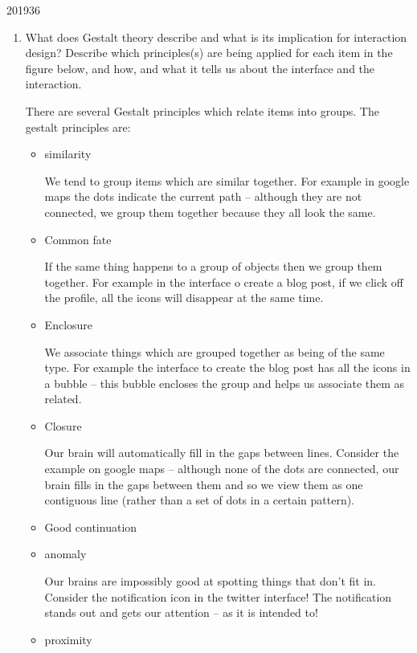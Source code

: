 \documentclass[10pt,\jkfside,a4paper]{article}
\begin{document}
\begin{examquestion}{2019}{3}{6}
\begin{enumerate}[label=(\alph*)]
\begin{itemize}
\end{itemize}

\item What does Gestalt theory describe and what is its implication for
interaction design? Describe which principles(s) are being applied for each
item in the figure below, and how, and what it tells us about the interface and
the interaction.

There are several Gestalt principles which relate items into groups. The gestalt principles are:

\begin{itemize}

\item similarity

We tend to group items which are similar together. For example in google maps the
dots indicate the current path -- although they are not connected, we group them
together because they all look the same.

\item Common fate

If the same thing happens to a group of objects then we group them together. For
example in the interface o create a blog post, if we click off the profile, all the
icons will disappear at the same time.

\item Enclosure

We associate things which are grouped together as being of the same type.
For example the interface to create the blog post has all the icons in a
bubble -- this bubble encloses the group and helps us associate them as
related.

\item Closure

Our brain will automatically fill in the gaps between lines. Consider the example
on google maps -- although none of the dots are connected, our brain fills in the
gaps between them and so we view them as one contiguous line (rather than a
set of dots in a certain pattern).

\item Good continuation

\item anomaly

Our brains are impossibly good at spotting things that don't fit in. Consider the
notification icon in the twitter interface! The notification stands out and gets
our attention -- as it is intended to!

\item proximity


\end{itemize}
\end{enumerate}
\end{examquestion}
\end{document}
